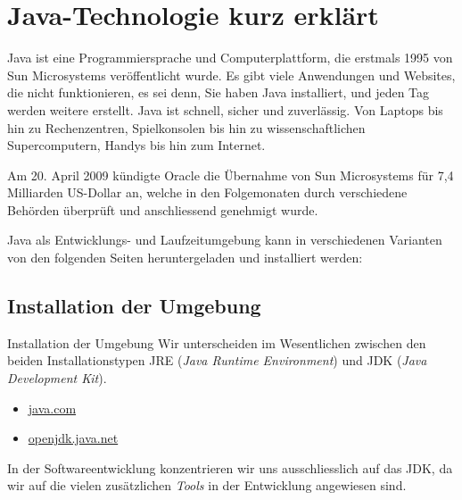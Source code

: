 \mode*

\setmonofont{Verdana}
	
\section{Java-Technologie kurz erklärt}

Java ist eine Programmiersprache und Computerplattform, die erstmals 1995 von 
Sun Microsystems veröffentlicht wurde. Es gibt viele Anwendungen und 
Websites, die nicht funktionieren, es sei denn, Sie haben Java installiert, 
und jeden Tag werden weitere erstellt. Java ist schnell, sicher und 
zuverlässig. Von Laptops bis hin zu Rechenzentren, Spielkonsolen bis hin zu 
wissenschaftlichen Supercomputern, Handys bis hin zum Internet.

Am 20. April 2009 kündigte Oracle die Übernahme von Sun Microsystems für 
7,4 Milliarden US-Dollar an, welche in den Folgemonaten durch verschiedene
Behörden überprüft und anschliessend genehmigt wurde.

Java als Entwicklungs- und Laufzeitumgebung kann in verschiedenen Varianten
von den folgenden Seiten heruntergeladen und installiert werden:

\subsection{Installation der Umgebung}

\begin{frame}{Installation der Umgebung}
	Wir unterscheiden im Wesentlichen zwischen den beiden Installationstypen
	JRE ({\em Java Runtime Environment}) und JDK ({\em Java 
	Development Kit}).
	
    \begin{itemize}
		\item \href{https://java.com}{java.com}   
		\item \href{https://openjdk.java.net}{openjdk.java.net}
    \end{itemize}
\end{frame}

In der Softwareentwicklung konzentrieren wir uns ausschliesslich auf das JDK,
da wir auf die vielen zusätzlichen {\em Tools} in der Entwicklung angewiesen
sind.
	
